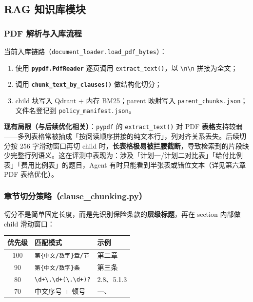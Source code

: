 \documentclass[11pt,a4paper]{ctexart}
\begin{document}
\subsection{RAG 知识库模块}

\subsubsection{PDF 解析与入库流程}

当前入库链路（\texttt{document\_loader.load\_pdf\_bytes}）：

\begin{enumerate}[nosep]
  \item 使用 \textbf{\texttt{pypdf.PdfReader}} 逐页调用 \texttt{extract\_text()}，以 \texttt{\textbackslash n\textbackslash n} 拼接为全文；
  \item 调用 \textbf{\texttt{chunk\_text\_by\_clauses()}} 做结构化切分；
  \item child 块写入 Qdrant + 内存 BM25；parent 映射写入 \texttt{parent\_chunks.json}；文件名登记到 \texttt{policy\_manifest.json}。
\end{enumerate}

\textbf{现有局限（与后续优化相关）}：\texttt{pypdf} 的 \texttt{extract\_text()} 对 PDF \textbf{表格}支持较弱——多列表格常被抽成「按阅读顺序拼接的纯文本行」，列对齐关系丢失。后续切分按 256 字滑动窗口再切 child 时，\textbf{长表格极易被拦腰截断}，导致检索到的片段缺少完整行列语义。这在评测中表现为：涉及「计划一/计划二对比表」「给付比例表」「费用比例表」的题目，Agent 有时只能看到半张表或错位文本（详见第六章 PDF 表格优化）。

\subsubsection{章节切分策略（clause\_chunking.py）}

切分不是简单固定长度，而是先识别保险条款的\textbf{层级标题}，再在 section 内部做 child 滑动窗口：

\begin{center}
\begin{tabular}{cll}
\toprule
\textbf{优先级} & \textbf{匹配模式} & \textbf{示例} \\
\midrule
100 & \texttt{第\{中文/数字\}章/节} & 第二章 \\
90 & \texttt{第\{中文/数字\}条} & 第三条 \\
80 & \texttt{\textbackslash d+\textbackslash.\textbackslash d+(\textbackslash.\textbackslash d+)?} & 2.8、5.1.3 \\
70 & 中文序号 + 顿号 & 一、 \\
\bottomrule
\end{tabular}
\end{center}
\end{document}
